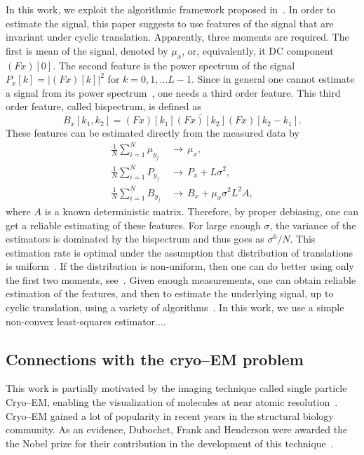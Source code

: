 \documentclass[journal]{IEEEtran}
\newcommand{\TODO}[1]{{\color{red}{[#1]}}}
\numberwithin{equation}{section}
\numberwithin{figure}{section}
\theoremstyle{plain}
\theoremstyle{definition}
\theoremstyle{remark}
\theoremstyle{plain}
\theoremstyle{remark}
\theoremstyle{plain}
\theoremstyle{plain}
\begin{document}
In this work, we exploit the algorithmic framework proposed in~\cite{bendory2017bispectrum}. In order to estimate the signal, this paper suggests to use features of the signal that are invariant under cyclic translation.
Apparently, three moments are required. The first is mean of the signal, denoted by $\mu_x$, or, equivalently, it DC component $(Fx)[0]$. The second feature is the power spectrum of the signal $P_x[k] = \vert (Fx)[k]\vert^2$ for $k=0,1,\ldots L-1$. Since in general one cannot estimate  a signal from its power spectrum~\cite{bendory2017fourier}, one needs a third order feature. This third order feature, called bispectrum, is defined as~\cite{tukey1953}
\begin{equation}
B_x[k_1,k_2] = (Fx)[k_1]\overline{(Fx)[k_2]}(Fx)[k_2-k_1].
\end{equation}  
These features can be estimated directly from the measured data by
\begin{align}
\frac{1}{N}\sum_{i=1}^N\mu_{y_j}  &\,\to \, \mu_x, \\
\frac{1}{N}\sum_{i=1}^NP_{y_j}  &\,\to \, P_x + L\sigma^2, \\
\frac{1}{N}\sum_{i=1}^NB_{y_j}  &\,\to \, B_x + \mu_x\sigma^2L^2A, 
\end{align} 
where $A$ is a known deterministic matrix. Therefore, by proper debiasing, one can get a reliable estimating of these features. For large enough $\sigma$, the variance of the estimators  is dominated by the bispectrum and thus goes as $\sigma^6/N$. This estimation rate is optimal under the assumption that distribution of translations is uniform~\cite{bandeira2017optimal}. If the distribution is non-uniform, then one can do better using only the first two moments, see~\cite{abbe2017multireference}. 
 Given enough measurements, one can obtain reliable estimation of the features, and then to estimate the underlying signal, up to cyclic translation, using a variety of algorithms~\cite{bendory2017bispectrum}. In this work, we use a simple non-convex least-squares estimator.... \TODO{Need to see what do we actually solve...}




\subsection{Connections with the cryo--EM problem} \label{sec:cryoEM}

This work is partially motivated by the imaging
technique called single particle Cryo--EM, enabling the visualization of molecules at near atomic resolution~\cite{bartesaghi20152,sirohi20163}. Cryo--EM gained a lot of popularity in recent years in the structural biology community. As an evidence, Dubochet, Frank and Henderson were awarded the 
the Nobel prize for their contribution in the development of this technique~\cite{nobel}. 
\end{document}
